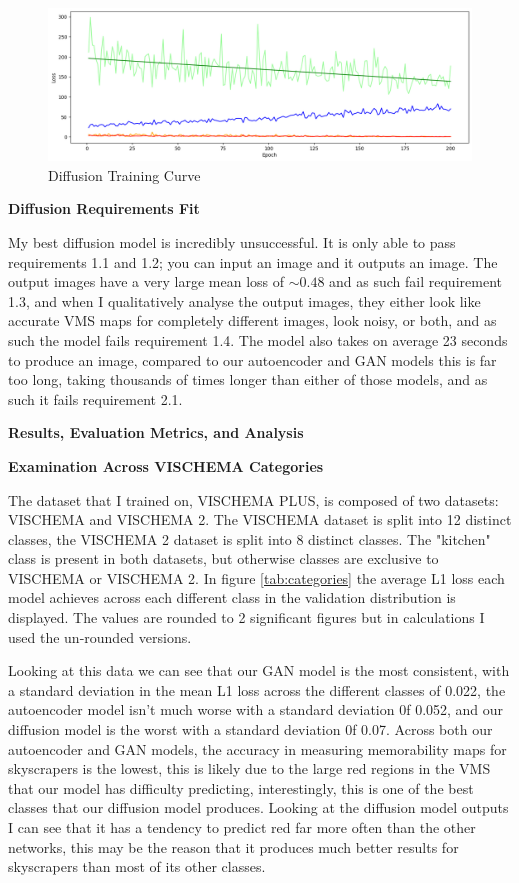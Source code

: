 \documentclass{UoYCSproject}
\begin{document}
\begin{figure}[ht]
    \centering
    \includegraphics[width=\linewidth]{GAN training curve}
    \caption{Diffusion Training Curve}
    \label{fig:DiffusionTraining}
\end{figure}

\textbf{Diffusion Requirements Fit}

My best diffusion model is incredibly unsuccessful. It is only able to pass requirements 1.1 and 1.2; you can input an image and it outputs an image. The output images have a very large mean loss of \( \sim 0.48 \) and as such fail requirement 1.3, and when I qualitatively analyse the output images, they either look like accurate VMS maps for completely different images, look noisy, or both, and as such the model fails requirement 1.4. The model also takes on average 23 seconds to produce an image, compared to our autoencoder and GAN models this is far too long, taking thousands of times longer than either of those models, and as such it fails requirement 2.1. 

\textbf{Results, Evaluation Metrics, and Analysis}

\textbf{Examination Across VISCHEMA Categories}

The dataset that I trained on, VISCHEMA PLUS, is composed of two datasets: VISCHEMA and VISCHEMA 2. The VISCHEMA dataset is split into 12 distinct classes, the VISCHEMA 2 dataset is split into 8 distinct classes. The "kitchen" class is present in both datasets, but otherwise classes are exclusive to VISCHEMA or VISCHEMA 2. In figure \ref{tab:categories} the average L1 loss each model achieves across each different class in the validation distribution is displayed. The values are rounded to 2 significant figures but in calculations I used the un-rounded versions. 

Looking at this data we can see that our GAN model is the most consistent, with a standard deviation in the mean L1 loss across the different classes of 0.022, the autoencoder model isn't much worse with a standard deviation 0f 0.052, and our diffusion model is the worst with a standard deviation 0f 0.07. Across both our autoencoder and GAN models, the accuracy in measuring memorability maps for skyscrapers is the lowest, this is likely due to the large red regions in the VMS that our model has difficulty predicting, interestingly, this is one of the best classes that our diffusion model produces. Looking at the diffusion model outputs I can see that it has a tendency to predict red far more often than the other networks, this may be the reason that it produces much better results for skyscrapers than most of its other classes.  
\end{document}

